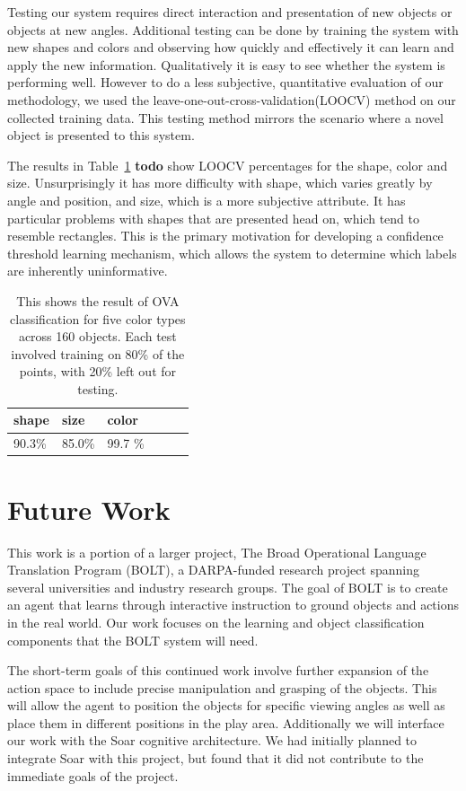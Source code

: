 \documentclass[11pt]{article}
\newcommand{\xxx}[1]{{\bf \color{red} #1}}
\newcommand\T{\rule{0pt}{3ex}}
\newcommand\B{\rule[-1.2ex]{0pt}{0pt}}
\begin{document}
Testing our system requires direct interaction and presentation of new objects
or objects at new angles.  Additional testing can be done by training the
system with new shapes and colors and observing how quickly and effectively it
can learn and apply the new information.  Qualitatively it is easy to see
whether the system is performing well.  However to do a less subjective,
quantitative evaluation of our methodology, we used the
leave-one-out-cross-validation(LOOCV) method on our collected training data. This
testing method mirrors the scenario where a novel object is presented to this
system.

The results in Table~\ref{tbl:testresults} \xxx{todo} show LOOCV percentages
for the shape, color and size.  Unsurprisingly it has more difficulty with shape,
which varies greatly by angle and position, and size, which is a more
subjective attribute. It has particular problems with shapes that are presented
head on, which tend to resemble rectangles.  This is the primary motivation for
developing a confidence threshold learning mechanism, which allows the system
to determine which labels are inherently uninformative.


\begin{table}
\centering
\begin{tabular}{ | l | l | l | l | l | l |}
    \hline
    shape &  size & color \T \B \\ \hline
    90.3\%  & 85.0\% & 99.7 \% \B \T \\ \hline
\end{tabular}
\caption{This shows the result of OVA classification for five color types
    across 160 objects. Each test involved training on 80\% of the points,
           with 20\% left out for testing.}
\label{tbl:testresults}
\end{table}

\section{Future Work}
\label{sec:future-work}
This work is a portion of a larger project, The Broad Operational Language
Translation Program (BOLT), a DARPA-funded research project spanning several
universities and industry research groups. The goal of BOLT is to create an
agent that learns through interactive instruction to ground objects and
actions in the real world. Our work focuses on the learning and object
classification components that the BOLT system will need.

The short-term goals of this continued work involve further expansion of the
action space to include precise manipulation and grasping of the objects. This
will allow the agent to position the objects for specific viewing angles as
well as place them in different positions in the play area. Additionally we will
interface our work with the Soar cognitive architecture. We had initially planned to
integrate Soar with this project, but found that it did not contribute
to the immediate goals of the project.
\end{document}
